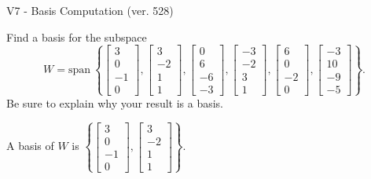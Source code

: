 \begin{exercise}
  \begin{exerciseTitle}V7 - Basis Computation (ver. 528)\end{exerciseTitle}
  \begin{exerciseStatement}
    Find a basis for the subspace 
\[W=\mathrm{span}\ \left\{\left[\begin{array}{r}
3 \\
0 \\
-1 \\
0
\end{array}\right] , \left[\begin{array}{r}
3 \\
-2 \\
1 \\
1
\end{array}\right] , \left[\begin{array}{r}
0 \\
6 \\
-6 \\
-3
\end{array}\right] , \left[\begin{array}{r}
-3 \\
-2 \\
3 \\
1
\end{array}\right] , \left[\begin{array}{r}
6 \\
0 \\
-2 \\
0
\end{array}\right] , \left[\begin{array}{r}
-3 \\
10 \\
-9 \\
-5
\end{array}\right]\right\}.\]
 Be sure to explain why your result is a basis.


  \end{exerciseStatement}
  \begin{exerciseAnswer}
   A basis of \(W\) is  \(\left\{\left[\begin{array}{r}
3 \\
0 \\
-1 \\
0
\end{array}\right] , \left[\begin{array}{r}
3 \\
-2 \\
1 \\
1
\end{array}\right]\right\}\).
  


  \end{exerciseAnswer}
\end{exercise}